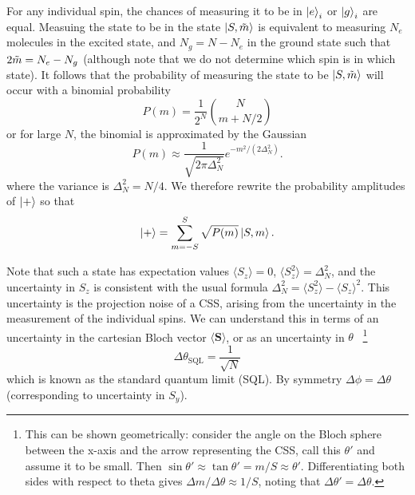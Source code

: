 For any individual spin, the chances of measuring it to be in $\ket{e}_i$ or
$\ket{g}_i$ are equal. Measuing the state to be in the state $\ket{S, \tilde{m}}$
is equivalent to measuring $N_e$ molecules in the excited state, and $N_g = N -
N_e$ in the ground state such that $2\tilde{m} = N_e - N_g$ (although note that
we do not determine which spin is in which state). It follows that the
probability of measuring the state to be $\ket{S,\tilde{m}}$ will occur with a
binomial probability~\cite{Gazeau2009}
%
\begin{equation}
  P(m) = \frac{1}{2^N} \binom{N}{m+N/2}
\end{equation}
%
or for large $N$, the binomial is approximated by the Gaussian
%
\begin{equation}
  P(m) \approx\frac{1}{\sqrt{2\pi \Delta_N^2}} e^{-m^2/(2\Delta_N^2)}.
  \label{squeeze:eqn:CSSmprob}
\end{equation}
%
where the variance is $\Delta_N^2 = N/4$. We therefore rewrite the probability
amplitudes of $\ket{+}$ so that
%
\begin{equation}
  \ket{+} = \sum_{m=-S}^S \sqrt{P(m)}\ket{S,m}.
  \label{squeeze:eqn:plusdicke}
\end{equation}

%
Note that such a state has expectation values $\langle S_z \rangle = 0$,
$\langle S_z^2\rangle = \Delta_N^2$, and the uncertainty in $S_z$ is consistent
with the usual formula $\Delta_N^2 = \langle S_z^2 \rangle - \langle
S_z\rangle^2$. This uncertainty is the projection noise of a CSS, arising from
the uncertainty in the measurement of the individual spins. We can understand
this in terms of an uncertainty in the cartesian Bloch vector $\langle
\mathbf{S} \rangle$, or as an uncertainty in $\theta$~\cite{PhysRevA.47.3554}
%
\footnote{This can be shown geometrically: consider the angle on the Bloch
sphere between the x-axis and the arrow representing the CSS, call this
$\theta'$ and assume it to be small. Then $\sin
\theta' \approx \tan \theta' = m/S \approx \theta'$. Differentiating both sides
with respect to theta gives $\Delta m / \Delta \theta \approx 1/S$, noting that
$\Delta \theta' = \Delta \theta$.
}
%
\begin{equation}
  \Delta\theta_\text{SQL} = \frac{1}{\sqrt{N}}
\end{equation}
which is known as the standard quantum limit (SQL). By symmetry $\Delta \phi =
\Delta \theta$ (corresponding to uncertainty in $S_y$).
%

